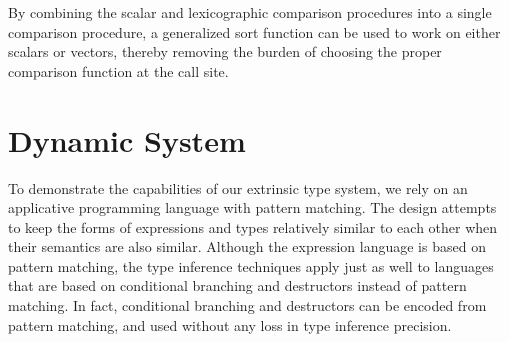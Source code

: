 \documentclass[acmsmall]{acmart}
\theoremstyle{definition}
\begin{document}

\noindent
By combining the scalar and lexicographic comparison procedures into a single comparison
procedure, a generalized sort function can be used to work on either scalars or vectors,
thereby removing the burden of choosing the proper comparison function at the call site.  


\section{Dynamic System}
\label{sec:dynamic_system}

\noindent
To demonstrate the capabilities of our extrinsic type system, 
we rely on an applicative programming language with pattern matching.
The design attempts to keep the forms of expressions and types relatively 
similar to each other when their semantics are also similar. 
Although the expression language is based on pattern matching, 
the type inference techniques apply just as well to languages
that are based on conditional branching and destructors instead of pattern matching.
In fact, conditional branching and destructors can be encoded from pattern matching,
and used without any loss in type inference precision.
\end{document}
